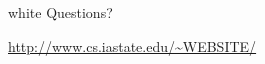 



\begin{frame}
\begin{beamercolorbox}[center]{white}
  {\Large Questions?}

  \vspace{2em}\hfill

  \url{http://www.cs.iastate.edu/~WEBSITE/}
\end{beamercolorbox}
\end{frame}
